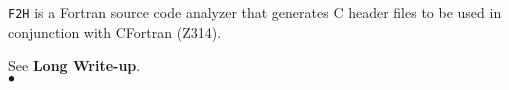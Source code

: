                        
                
              
{\tt F2H} is a Fortran source code analyzer that generates
C header files to be used in conjunction with CFortran (Z314).

\Usage
See {\bf Long Write-up}.
\\ $\bullet$
